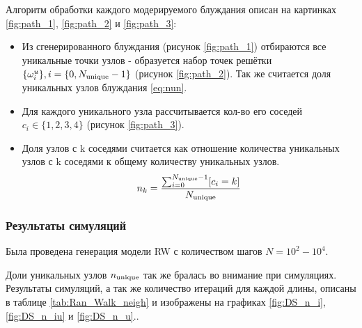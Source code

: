 Алгоритм обработки каждого модерируемого блуждания описан на картинках \ref{fig:path_1}, \ref{fig:path_2} и \ref{fig:path_3}:
\begin{itemize}
    \item Из сгенерированного блуждания (рисунок \ref{fig:path_1}) отбираются все уникальные точки узлов - образуется набор точек решётки $\{\omega^u_i\}, i = \{0, N_{\textup{unique}}-1\}$ (рисунок \ref{fig:path_2}). Так же считается доля уникальных узлов блуждания \eqref{eq:nun}.
    \item Для каждого уникального узла рассчитывается кол-во его соседей $c_i \in \{1,2,3,4\}$  (рисунок \ref{fig:path_3}).
    \item Доля узлов с k соседями считается как отношение количества уникальных узлов с k соседями к общему количеству уникальных узлов.
	\begin{equation}
	n_k = \frac{\sum_{i=0}^{N_{\textup{unique}}-1}[c_i = k]}{N_{\textup{unique}}}
	\label{eq:n_i}
	\end{equation}
\end{itemize}

\subsubsection{Результаты симуляций}

Была проведена генерация модели RW с количеством шагов $N = 10^{2}-10^{4}$. 

Доли уникальных узлов $n_{\textup{unique}}$ так же бралась во внимание при симуляциях. 
Результаты симуляций, а так же количество итераций для каждой длины, описаны в таблице \ref{tab:Ran_Walk_neigh} и изображены на графиках \ref{fig:DS_n_i}, \ref{fig:DS_n_iu} и \ref{fig:DS_n_u}.\footnotemark{}.

